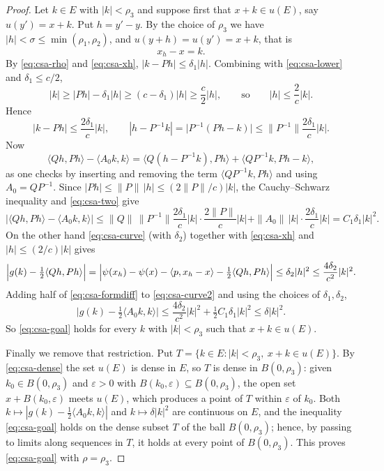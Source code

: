 \begin{proof}
Let $k\in E$ with $|k|<\rho_3$ and suppose first that $x+k\in u(E)$, say
$u(y')=x+k$. Put $h=y'-y$. By the choice of $\rho_3$ we have
$|h|<\sigma\le\min(\rho_1,\rho_2)$, and $u(y+h)=u(y')=x+k$, that is
\begin{equation}\label{eq:csa-xh}
  x_h-x=k .
\end{equation}
By \eqref{eq:csa-rho} and \eqref{eq:csa-xh}, $|k-Ph|\le\delta_1|h|$. Combining
with \eqref{eq:csa-lower} and $\delta_1\le c/2$,
\[
  |k|\ge|Ph|-\delta_1|h|\ge(c-\delta_1)|h|\ge\frac{c}{2}|h|,
  \qquad\text{so}\qquad |h|\le\frac{2}{c}|k| .
\]
Hence
\begin{equation}\label{eq:csa-two}
  |k-Ph|\le\frac{2\delta_1}{c}|k|,
  \qquad
  |h-P^{-1}k|=\bigl|P^{-1}(Ph-k)\bigr|\le\|P^{-1}\|\frac{2\delta_1}{c}|k| .
\end{equation}
Now
\[
  \langle Qh,Ph\rangle-\langle A_0k,k\rangle
   =\bigl\langle Q(h-P^{-1}k),Ph\bigr\rangle
    +\bigl\langle QP^{-1}k,Ph-k\bigr\rangle,
\]
as one checks by inserting and removing the term
$\langle QP^{-1}k,Ph\rangle$ and using $A_0=QP^{-1}$. Since
$|Ph|\le\|P\|\,|h|\le(2\|P\|/c)|k|$, the Cauchy--Schwarz inequality and
\eqref{eq:csa-two} give
\begin{equation}\label{eq:csa-formdiff}
  \bigl|\langle Qh,Ph\rangle-\langle A_0k,k\rangle\bigr|
   \le\|Q\|\,\|P^{-1}\|\frac{2\delta_1}{c}|k|\cdot\frac{2\|P\|}{c}|k|
    +\|A_0\|\,|k|\cdot\frac{2\delta_1}{c}|k|
   =C_1\delta_1|k|^2 .
\end{equation}
On the other hand \eqref{eq:csa-curve} (with $\delta_2$) together with
\eqref{eq:csa-xh} and $|h|\le(2/c)|k|$ gives
\begin{equation}\label{eq:csa-curve2}
  \Bigl|g(k)-\tfrac12\langle Qh,Ph\rangle\Bigr|
   =\Bigl|\psi(x_h)-\psi(x)-\langle p,x_h-x\rangle-\tfrac12\langle Qh,Ph\rangle\Bigr|
   \le\delta_2|h|^2\le\frac{4\delta_2}{c^2}|k|^2 .
\end{equation}
Adding half of \eqref{eq:csa-formdiff} to \eqref{eq:csa-curve2} and using the
choices of $\delta_1,\delta_2$,
\[
  \bigl|g(k)-\tfrac12\langle A_0k,k\rangle\bigr|
   \le\frac{4\delta_2}{c^2}|k|^2+\tfrac12C_1\delta_1|k|^2
   \le\delta|k|^2 .
\]
So \eqref{eq:csa-goal} holds for every $k$ with $|k|<\rho_3$ such that
$x+k\in u(E)$.

Finally we remove that restriction. Put
$T=\{k\in E:|k|<\rho_3,\ x+k\in u(E)\}$. By \eqref{eq:csa-dense} the set $u(E)$
is dense in $E$, so $T$ is dense in $B(0,\rho_3)$: given $k_0\in B(0,\rho_3)$ and
$\varepsilon>0$ with $B(k_0,\varepsilon)\subseteq B(0,\rho_3)$, the open set
$x+B(k_0,\varepsilon)$ meets $u(E)$, which produces a point of $T$ within
$\varepsilon$ of $k_0$. Both $k\mapsto|g(k)-\tfrac12\langle A_0k,k\rangle|$ and
$k\mapsto\delta|k|^2$ are continuous on $E$, and the inequality
\eqref{eq:csa-goal} holds on the dense subset $T$ of the ball $B(0,\rho_3)$;
hence, by passing to limits along sequences in $T$, it holds at every point of
$B(0,\rho_3)$. This proves \eqref{eq:csa-goal} with $\rho=\rho_3$.


\end{proof}
